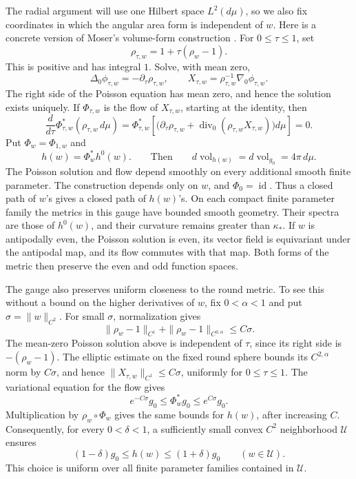 The radial argument will use one Hilbert space \(L^2(d\mu)\), so we also
fix coordinates in which the angular area form is independent of \(w\).
Here is a concrete version of Moser's volume-form construction
\cite[Section~4, Theorem~2]{Moser}.  For \(0\leq\tau\leq1\), set
\[
 \rho_{\tau,w}=1+\tau(\rho_w-1).
\]
This is positive and has integral \(1\).  Solve, with mean zero,
\[
 \Delta_0\phi_{\tau,w}=-\partial_\tau\rho_{\tau,w},
 \qquad
 X_{\tau,w}=\rho_{\tau,w}^{-1}\nabla_0\phi_{\tau,w}.
\]
The right side of the Poisson equation has mean zero, and hence the
solution exists uniquely.  If \(\Phi_{\tau,w}\) is the flow of
\(X_{\tau,w}\), starting at the identity, then
\[
 \frac{d}{d\tau}\Phi_{\tau,w}^*(\rho_{\tau,w}\,d\mu)
 =\Phi_{\tau,w}^*
   \left[\bigl(\partial_\tau\rho_{\tau,w}
          +\operatorname{div}_0(\rho_{\tau,w}X_{\tau,w})\bigr)d\mu\right]=0.
\]
Put \(\Phi_w=\Phi_{1,w}\) and
\begin{equation}\label{n:eq-fixed-area-gauge}
 h(w)=\Phi_w^*h^0(w).
 \qquad\text{Then}\qquad
 d\operatorname{vol}_{h(w)}=d\operatorname{vol}_{g_0}=4\pi\,d\mu .
\end{equation}
The Poisson solution and flow depend smoothly on every additional smooth
finite parameter.  The construction depends only on \(w\), and
\(\Phi_0=\operatorname{id}\).  Thus a closed path of \(w\)'s gives a
closed path of \(h(w)\)'s.  On each compact finite parameter family the
metrics in this gauge have bounded smooth geometry.  Their spectra are
those of \(h^0(w)\), and their curvature remains greater than \(\kappa_*\).
If \(w\) is antipodally even, the Poisson solution is even, its vector
field is equivariant under the antipodal map, and its flow commutes with
that map.  Both forms
of the metric then preserve the even and odd function spaces.

The gauge also preserves uniform closeness to the round metric.  To see
this without a bound on the higher derivatives of \(w\), fix
\(0<\alpha<1\) and put \(\sigma=\|w\|_{C^2}\).  For small \(\sigma\),
normalization gives
\[
 \|\rho_w-1\|_{C^1}+\|\rho_w-1\|_{C^{0,\alpha}}\leq C\sigma.
\]
The mean-zero Poisson solution above is independent of \(\tau\), since
its right side is \(-(\rho_w-1)\).  The elliptic estimate on the fixed
round sphere bounds its \(C^{2,\alpha}\) norm by \(C\sigma\), and hence
\(\|X_{\tau,w}\|_{C^1}\leq C\sigma\), uniformly for \(0\leq\tau\leq1\).
The variational equation for the flow gives
\[
 e^{-C\sigma}g_0\leq\Phi_w^*g_0\leq e^{C\sigma}g_0.
\]
Multiplication by \(\rho_w\circ\Phi_w\) gives the same bounds for
\(h(w)\), after increasing \(C\).  Consequently, for every
\(0<\delta<1\), a sufficiently small convex \(C^2\) neighborhood
\(\mathcal U\) ensures
\begin{equation}\label{n:eq-gauge-closeness}
 (1-\delta)g_0\leq h(w)\leq(1+\delta)g_0
 \qquad(w\in\mathcal U).
\end{equation}
This choice is uniform over all finite parameter families contained in
\(\mathcal U\).

